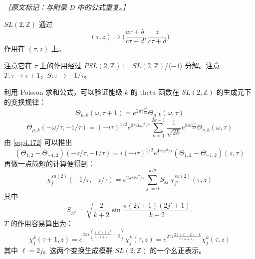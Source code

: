 {\small\itshape ［原文标记：与附录 D 中的公式重复。］}

$SL(2,\mathbb{Z})$ 通过
\begin{equation}
  (\tau,z)\to\Big(\frac{a\tau+b}{c\tau+d},\frac{z}{c\tau+d}\Big)
  \tag{4.170}
  \label{eq:4.170}
\end{equation}
作用在 $(\tau,z)$ 上。


注意它在 $\tau$ 上的作用经过 $PSL(2,\mathbb{Z}):=SL(2,\mathbb{Z})/\langle-1\rangle$ 分解。注意 $T:\tau\to\tau+1$，$S:\tau\to-1/\tau$。

利用 Poisson 求和公式，可以验证能级 $k$ 的 theta 函数在 $SL(2,\mathbb{Z})$ 的生成元下的变换规律：
\begin{equation}
  \Theta_{\mu,k}(\omega,\tau+1)=e^{2\pi i\frac{\mu^2}{4k}}\Theta_{\mu,k}(\omega,\tau)
  \tag{4.171}
  \label{eq:4.171}
\end{equation}
\begin{equation}
  \Theta_{\mu,k}(-\omega/\tau,-1/\tau)=(-i\tau)^{1/2}e^{2\pi ik\omega^2/\tau}
  \sum_{\nu=0}^{2k-1}\frac{1}{\sqrt{2k}}e^{2\pi i\frac{\mu\nu}{2k}}\Theta_{\nu,k}(\omega,\tau)
  \tag{4.172}
  \label{eq:4.172}
\end{equation}
由 \eqref{eq:4.172} 可以推出
\begin{equation}
  (\Theta_{1,2}-\Theta_{-1,2})(-z/\tau,-1/\tau)
  =i(-i\tau)^{1/2}e^{4\pi iz^2/\tau}(\Theta_{1,2}-\Theta_{-1,2})(z,\tau)
  \tag{4.173}
  \label{eq:4.173}
\end{equation}
再做一点简短的计算便得到：
\begin{equation}
  \chi_j^{su(2)}(-1/\tau,-z/\tau)=e^{2\pi ikz^2/\tau}
  \sum_{j'=0}^{k/2}S_{jj'}\chi_{j'}^{su(2)}(\tau,z)
  \tag{4.174}
  \label{eq:4.174}
\end{equation}
其中
\begin{equation}
  S_{jj'}=\sqrt{\frac{2}{k+2}}\sin\frac{\pi(2j+1)(2j'+1)}{k+2}.
  \tag{4.175}
  \label{eq:4.175}
\end{equation}
$T$ 的作用容易算出为：
\begin{equation}
  \chi_j^k(\tau+1,z)
  =e^{2\pi i\left(\frac{(\ell+1)^2}{4(k+2)}-\frac18\right)}\chi_j^k(\tau,z)
  =e^{2\pi i\frac{2\ell(\ell+2)-k}{8(k+2)}}\chi_j^k(\tau,z)
  \tag{4.176}
  \label{eq:4.176}
\end{equation}
其中 $\ell=2j$。这两个变换生成模群 $SL(2,\mathbb{Z})$ 的一个幺正表示。

